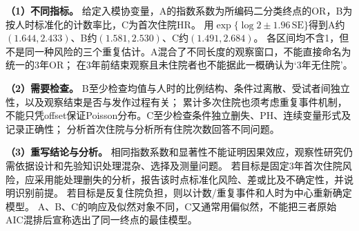 \textbf{（1）不同指标。} 给定入模协变量，A的指数系数为所编码二分类终点的OR，B为按人时标准化的计数率比，C为首次住院HR。
用$\exp\{\log2\pm1.96\,\mathrm{SE}\}$得到A约$(1.644,2.433)$、B约$(1.581,2.530)$、C约$(1.491,2.684)$。
各区间均不含1，但不是同一种风险的三个重复估计。A混合了不同长度的观察窗口，不能直接命名为统一的3年OR；
在3年前结束观察且未住院者也不能据此一概确认为‘3年无住院’。
\par\textbf{（2）需要检查。} B至少检查均值与人时的比例结构、条件过离散、受试者间独立性，以及观察结束是否与发作过程有关；
累计多次住院也须考虑重复事件机制，不能只凭offset保证Poisson分布。C至少检查条件独立删失、PH、连续变量形式及记录正确性；
分析首次住院与分析所有住院次数回答不同问题。
\par\textbf{（3）重写结论与分析。} 相同指数系数和显著性不能证明因果效应，观察性研究仍需依据设计和先验知识处理混杂、选择及测量问题。
若目标是固定3年首次住院风险，应采用能处理删失的分析，报告该时点标准化风险、差或比及不确定性，并说明识别前提。
若目标是反复住院负担，则以计数/重复事件和人时为中心重新确定模型。
A、B、C的响应及似然对象不同，C又通常用偏似然，不能把三者原始AIC混排后宣称选出了同一终点的最佳模型。
\par\nobreak\smallskip{}
